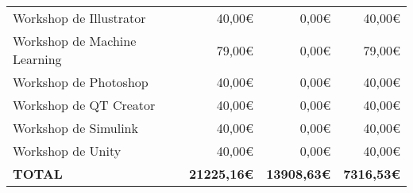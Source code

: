 \begin{longtable}{Xrrr}
Workshop de Illustrator & 40,00€ & 0,00€ & 40,00€ \\

Workshop de Machine Learning & 79,00€ & 0,00€ & 79,00€ \\

Workshop de Photoshop & 40,00€ & 0,00€ & 40,00€ \\

Workshop de QT Creator & 40,00€ & 0,00€ & 40,00€ \\

Workshop de Simulink & 40,00€ & 0,00€ & 40,00€ \\

Workshop de Unity & 40,00€ & 0,00€ & 40,00€ \\

\midrule \midrule

\bfseries TOTAL & \bfseries 21225,16€ & \bfseries 13908,63€ & \bfseries 7316,53€ \\


\end{longtable}